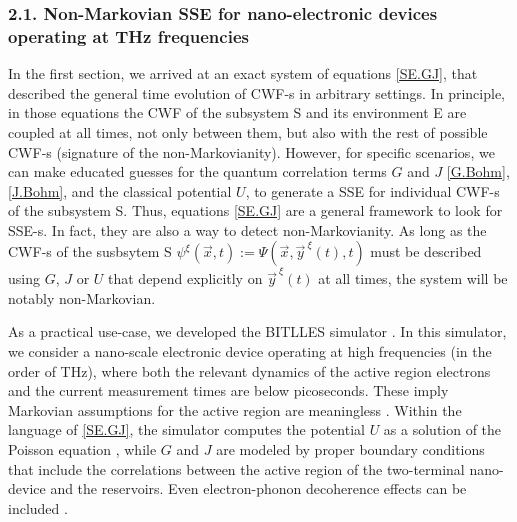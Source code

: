 \documentclass[11pt, a4paper]{article} %
\begin{document}
\subsubsection*{2.1. Non-Markovian SSE for nano-electronic devices operating at THz frequencies}\vspace{-0.15cm}
In the first section, we arrived at an exact system of equations \eqref{SE.GJ}, that described the general time evolution of CWF-s in arbitrary settings. In principle, in those equations the CWF of the subsystem S and its environment E are coupled at all times, not only between them, but also with the rest of possible CWF-s (signature of the non-Markovianity). However, for specific scenarios, we can make educated guesses for the quantum correlation terms $G$ and $J$ \eqref{G.Bohm},\eqref{J.Bohm}, and the classical potential $U$, to generate a SSE for individual CWF-s of the subsystem S. Thus, equations \eqref{SE.GJ} are a general framework to look for SSE-s. In fact, they are also a way to detect non-Markovianity. As long as the CWF-s of the susbsytem S $\psi^\xi(\vec{x},t):=\Psi(\vec{x},\vec{y}^{\:\xi}(t),t)$ must be described using $G$, $J$ or $U$ that depend explicitly on $\vec{y}^{\:\xi}(t)$ at all times, the system will be notably non-Markovian.

As a practical use-case, we developed the BITLLES simulator \cite{tdp,Pois,Thz}. In this simulator, we consider a nano-scale electronic device operating at high frequencies (in the order of THz), where both the relevant dynamics of the active region electrons and the current measurement times are below picoseconds. These imply Markovian assumptions for the active region are meaningless \cite{Thz}. Within the language of \eqref{SE.GJ}, the simulator computes the potential $U$ as a solution of the Poisson equation \cite{Pois}, while $G$ and $J$ are modeled by proper boundary conditions \cite{boundary1, boundary2} that include the correlations between the active region of the two-terminal nano-device and the reservoirs. Even electron-phonon decoherence effects can be included \cite{eph}.
\end{document}
